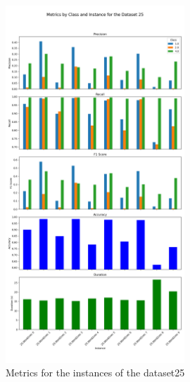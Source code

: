 \begin{figure}[H]
\centering
\includegraphics[width=0.6\textwidth]{img/annexes/25/25 - Metrics.png}
\caption{Metrics for the instances of the dataset25}
\label{fig:25_metrics_instance}
\end{figure}

